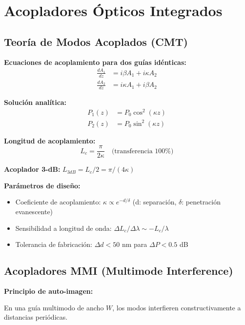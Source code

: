 \documentclass[11pt,a4paper]{article}
\begin{document}
\section{Acopladores Ópticos Integrados}

\subsection{Teoría de Modos Acoplados (CMT)}

\textbf{Ecuaciones de acoplamiento para dos guías idénticas:}
\begin{align}
    \frac{dA_1}{dz} &= i\beta A_1 + i\kappa A_2 \\
    \frac{dA_2}{dz} &= i\kappa A_1 + i\beta A_2
\end{align}

\textbf{Solución analítica:}
\begin{align}
    P_1(z) &= P_0\cos^2(\kappa z)\\
    P_2(z) &= P_0\sin^2(\kappa z)
\end{align}

\textbf{Longitud de acoplamiento:}
\begin{equation}
    L_c = \frac{\pi}{2\kappa} \quad \text{(transferencia 100\%)}
\end{equation}

\textbf{Acoplador 3-dB:} $L_{3dB} = L_c/2 = \pi/(4\kappa)$

\textbf{Parámetros de diseño:}
\begin{itemize}
    \item Coeficiente de acoplamiento: $\kappa \propto e^{-d/\delta}$ (d: separación, $\delta$: penetración evanescente)
    \item Sensibilidad a longitud de onda: $\Delta L_c/\Delta\lambda \sim -L_c/\lambda$
    \item Tolerancia de fabricación: $\Delta d < 50$ nm para $\Delta P < 0.5$ dB
\end{itemize}

\subsection{Acopladores MMI (Multimode Interference)}

\textbf{Principio de auto-imagen:}

En una guía multimodo de ancho $W$, los modos interfieren constructivamente a distancias periódicas.
\end{document}
